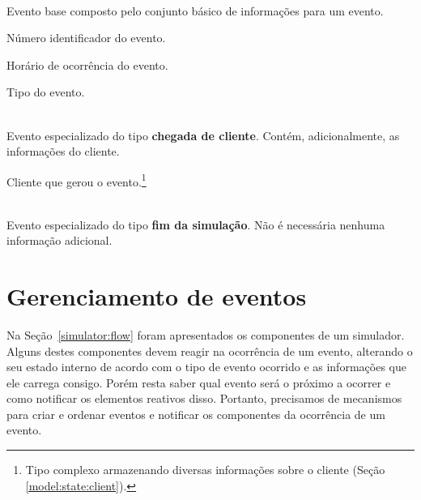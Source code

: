 \begin{description}\setlength\itemsep{0mm}
  \item[Event] \hfill \\
    Evento base composto pelo conjunto básico de informações para um evento.

    \begin{description}[leftmargin=!,labelwidth=\widthof{\bfseries client}]\setlength\itemsep{0mm}
      \item[\texttt{id}] Número identificador do evento.
      \item[\texttt{time}] Horário de ocorrência do evento.
      \item[\texttt{type}] Tipo do evento.
    \end{description}

  \item[ClientArrival] \hfill \\
    Evento especializado do tipo \textbf{chegada de cliente}. Contém,
    adicionalmente, as informações do cliente.

    \begin{description}[leftmargin=!,labelwidth=\widthof{\bfseries client}]\setlength\itemsep{0mm}
      \item[\texttt{client}] Cliente que gerou o evento.\footnote{Tipo complexo armazenando diversas informações sobre o cliente (Seção \ref{model:state:client}).}
    \end{description}

  \item[FinishSimulation] \hfill \\
    Evento especializado do tipo \textbf{fim da simulação}. Não é necessária
    nenhuma informação adicional.
\end{description}

\section{\label{sec:model:event}Gerenciamento de eventos}

Na Seção~\ref{simulator:flow} foram apresentados os componentes de um simulador.
Alguns destes componentes devem reagir na ocorrência de um evento, alterando o
seu estado interno de acordo com o tipo de evento ocorrido e as informações que
ele carrega consigo. Porém resta saber qual evento será o próximo a ocorrer e
como notificar os elementos reativos disso. Portanto, precisamos de mecanismos
para criar e ordenar eventos e notificar os componentes da ocorrência de um
evento.

